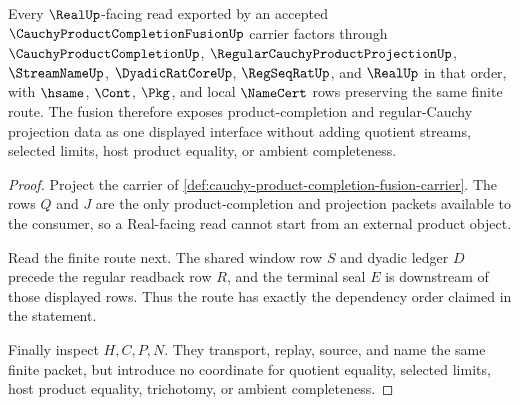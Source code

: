 \begin{theorem}
\label{thm:cauchy-product-completion-fusion-laws}
Every $\RealUp$-facing read exported by an accepted
$\CauchyProductCompletionFusionUp$ carrier factors through
$\CauchyProductCompletionUp$, $\RegularCauchyProductProjectionUp$,
$\StreamNameUp$, $\DyadicRatCoreUp$, $\RegSeqRatUp$, and $\RealUp$ in that
order, with $\hsame$, $\Cont$, $\Pkg$, and local $\NameCert$ rows preserving the
same finite route. The fusion therefore exposes product-completion and
regular-Cauchy projection data as one displayed interface without adding
quotient streams, selected limits, host product equality, or ambient
completeness.
\end{theorem}
\begin{proof}
Project the carrier of
\autoref{def:cauchy-product-completion-fusion-carrier}. The rows $Q$ and $J$
are the only product-completion and projection packets available to the
consumer, so a Real-facing read cannot start from an external product object.

Read the finite route next. The shared window row $S$ and dyadic ledger $D$
precede the regular readback row $R$, and the terminal seal $E$ is downstream
of those displayed rows. Thus the route has exactly the dependency order
claimed in the statement.

Finally inspect $H,C,P,N$. They transport, replay, source, and name the same
finite packet, but introduce no coordinate for quotient equality, selected
limits, host product equality, trichotomy, or ambient completeness.
\end{proof}

